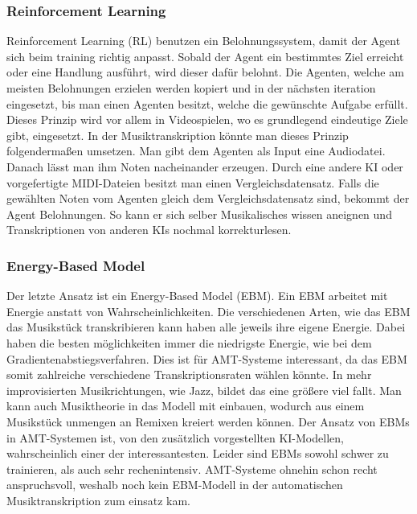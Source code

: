 \subsubsection*{Reinforcement Learning}
Reinforcement Learning (RL) benutzen ein Belohnungssystem, damit der Agent sich beim training richtig anpasst.
Sobald der Agent ein bestimmtes Ziel erreicht oder eine Handlung ausführt, wird dieser dafür belohnt.
Die Agenten, welche am meisten Belohnungen erzielen werden kopiert und in der nächsten iteration eingesetzt,
bis man einen Agenten besitzt, welche die gewünschte Aufgabe erfüllt.
Dieses Prinzip wird vor allem in Videospielen, wo es grundlegend eindeutige Ziele gibt, eingesetzt.
In der Musiktranskription könnte man dieses Prinzip folgendermaßen umsetzen.
Man gibt dem Agenten als Input eine Audiodatei.
Danach lässt man ihm Noten nacheinander erzeugen.
Durch eine andere KI oder vorgefertigte MIDI-Dateien besitzt man einen Vergleichsdatensatz.
Falls die gewählten Noten vom Agenten gleich dem Vergleichsdatensatz sind, bekommt der Agent Belohnungen.
So kann er sich selber Musikalisches wissen aneignen und Transkriptionen von anderen KIs nochmal korrekturlesen\cite{li2018music}.

\subsubsection*{Energy-Based Model}
Der letzte Ansatz ist ein Energy-Based Model (EBM).
Ein EBM arbeitet mit Energie anstatt von Wahrscheinlichkeiten\cite{lecun2006tutorial}.
Die verschiedenen Arten, wie das EBM das Musikstück transkribieren kann haben alle jeweils ihre eigene Energie.
Dabei haben die besten möglichkeiten immer die niedrigste Energie, wie bei dem Gradientenabstiegsverfahren.
Dies ist für AMT-Systeme interessant, da das EBM somit zahlreiche verschiedene Transkriptionsraten wählen könnte.
In mehr improvisierten Musikrichtungen, wie Jazz, bildet das eine größere viel fallt.
Man kann auch Musiktheorie in das Modell mit einbauen,
wodurch aus einem Musikstück unmengen an Remixen kreiert werden können.
Der Ansatz von EBMs in AMT-Systemen ist,
von den zusätzlich vorgestellten KI-Modellen, wahrscheinlich einer der interessantesten.
Leider sind EBMs sowohl schwer zu trainieren, als auch sehr rechenintensiv.
AMT-Systeme ohnehin schon recht anspruchsvoll,
weshalb noch kein EBM-Modell in der automatischen Musiktranskription zum einsatz kam.

